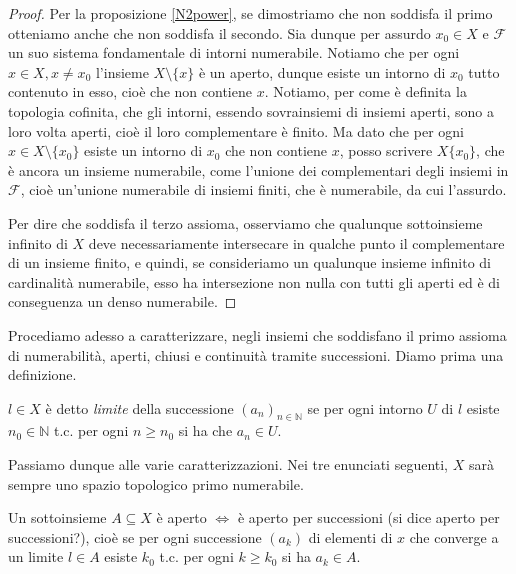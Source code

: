 \begin{proof}
	Per la proposizione \ref{N2power}, se dimostriamo che non soddisfa il primo
	otteniamo anche che non soddisfa il secondo. Sia dunque per assurdo $x_0 \in
	X$ e $\mathcal{F}$ un suo sistema fondamentale di intorni numerabile.
	Notiamo che per ogni $x \in X, x\not=x_0$ l'insieme $X \setminus \{ x\}$ è
	un aperto, dunque esiste un intorno di $x_0$ tutto contenuto in esso, cioè
	che non contiene $x$. Notiamo, per come è definita la topologia cofinita,
	che gli intorni, essendo sovrainsiemi di insiemi aperti, sono a loro volta
	aperti, cioè il loro complementare è finito. Ma dato che per ogni $x \in X
	\setminus \{ x_0\}$ esiste un intorno di $x_0$ che non contiene $x$, posso
	scrivere $X \{ x_0\}$, che è ancora un insieme numerabile, come l'unione dei
	complementari degli insiemi in $\mathcal{F}$, cioè un'unione numerabile di
	insiemi finiti, che è numerabile, da cui l'assurdo.

	Per dire che soddisfa il terzo assioma, osserviamo che qualunque sottoinsieme infinito di $X$ deve necessariamente intersecare in qualche punto il complementare di un insieme finito, e quindi, se consideriamo un qualunque insieme infinito di cardinalità numerabile, esso ha	intersezione non nulla con tutti gli aperti ed è di conseguenza un denso numerabile.
\end{proof}

Procediamo adesso a caratterizzare, negli insiemi che soddisfano il primo
assioma di numerabilità, aperti, chiusi e continuità tramite successioni.
Diamo prima una definizione.

\begin{defn}
	$l \in X$ è detto \textit{limite} della successione $(a_n)_{n \in
	\mathbb{N}}$ se per ogni intorno $U$ di $l$ esiste $n_0 \in \mathbb{N}$ t.c.
	per ogni $n \ge n_0$ si ha che $a_n \in U$.
\end{defn}

Passiamo dunque alle varie caratterizzazioni. Nei tre enunciati seguenti,
$X$ sarà sempre uno spazio topologico primo numerabile.

\begin{prop}
	Un sottoinsieme $A \subseteq X$ è aperto $\Leftrightarrow$ è aperto per
	successioni (si dice aperto per successioni?), cioè se per ogni successione
	$(a_k)$ di elementi di $x$ che converge a un limite $l \in A$ esiste $k_0$
	t.c. per ogni $k \ge k_0$ si ha $a_k \in A$.
\end{prop}

